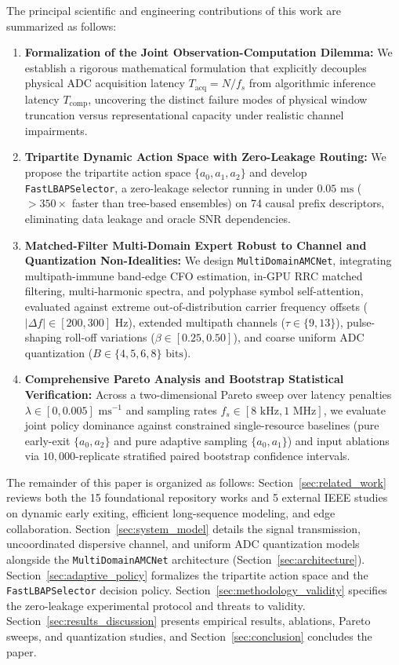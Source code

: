 The principal scientific and engineering contributions of this work are summarized as follows:
\begin{enumerate}
    \item \textbf{Formalization of the Joint Observation-Computation Dilemma:} We establish a rigorous mathematical formulation that explicitly decouples physical ADC acquisition latency $T_{\text{acq}} = N/f_s$ from algorithmic inference latency $T_{\text{comp}}$, uncovering the distinct failure modes of physical window truncation versus representational capacity under realistic channel impairments.
    \item \textbf{Tripartite Dynamic Action Space with Zero-Leakage Routing:} We propose the tripartite action space $\{a_0, a_1, a_2\}$ and develop \texttt{FastLBAPSelector}, a zero-leakage selector running in under $0.05\text{ ms}$ ($>350\times$ faster than tree-based ensembles) on 74 causal prefix descriptors, eliminating data leakage and oracle SNR dependencies.
    \item \textbf{Matched-Filter Multi-Domain Expert Robust to Channel and Quantization Non-Idealities:} We design \texttt{MultiDomainAMCNet}, integrating multipath-immune band-edge CFO estimation, in-GPU RRC matched filtering, multi-harmonic spectra, and polyphase symbol self-attention, evaluated against extreme out-of-distribution carrier frequency offsets ($|\Delta f| \in [200, 300]\text{ Hz}$), extended multipath channels ($\tau \in \{9, 13\}$), pulse-shaping roll-off variations ($\beta \in [0.25, 0.50]$), and coarse uniform ADC quantization ($B \in \{4, 5, 6, 8\}\text{ bits}$).
    \item \textbf{Comprehensive Pareto Analysis and Bootstrap Statistical Verification:} Across a two-dimensional Pareto sweep over latency penalties $\lambda \in [0, 0.005]\text{ ms}^{-1}$ and sampling rates $f_s \in [8\text{ kHz}, 1\text{ MHz}]$, we evaluate joint policy dominance against constrained single-resource baselines (pure early-exit $\{a_0, a_2\}$ and pure adaptive sampling $\{a_0, a_1\}$) and input ablations via $10,000$-replicate stratified paired bootstrap confidence intervals.
\end{enumerate}

The remainder of this paper is organized as follows: Section~\ref{sec:related_work} reviews both the 15 foundational repository works and 5 external IEEE studies on dynamic early exiting, efficient long-sequence modeling, and edge collaboration. Section~\ref{sec:system_model} details the signal transmission, uncoordinated dispersive channel, and uniform ADC quantization models alongside the \texttt{MultiDomainAMCNet} architecture (Section~\ref{sec:architecture}). Section~\ref{sec:adaptive_policy} formalizes the tripartite action space and the \texttt{FastLBAPSelector} decision policy. Section~\ref{sec:methodology_validity} specifies the zero-leakage experimental protocol and threats to validity. Section~\ref{sec:results_discussion} presents empirical results, ablations, Pareto sweeps, and quantization studies, and Section~\ref{sec:conclusion} concludes the paper.

